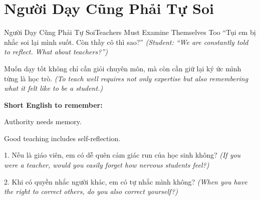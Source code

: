 \section{Người Dạy Cũng Phải Tự Soi}
\begin{truyen}{Người Dạy Cũng Phải Tự Soi}{Teachers Must Examine Themselves Too}
 ``Tụi em bị nhắc soi lại mình suốt. Còn thầy cô thì sao?''
\textit{(Student: ``We are constantly told to reflect. What about teachers?'')}

\end{truyen}

\begin{baihoc}
Muốn dạy tốt không chỉ cần giỏi chuyên môn, mà còn cần giữ lại ký ức mình từng là học trò.
\textit{(To teach well requires not only expertise but also remembering what it felt like to be a student.)}
\end{baihoc}

\begin{ghinhoanh}
\textbf{Short English to remember:}

Authority needs memory.

Good teaching includes self-reflection.
\end{ghinhoanh}

\begin{tuhocnhanh}
1. Nếu là giáo viên, em có dễ quên cảm giác run của học sinh không? \textit{(If you were a teacher, would you easily forget how nervous students feel?)}

2. Khi có quyền nhắc người khác, em có tự nhắc mình không? \textit{(When you have the right to correct others, do you also correct yourself?)}
\end{tuhocnhanh}

\ngancach
